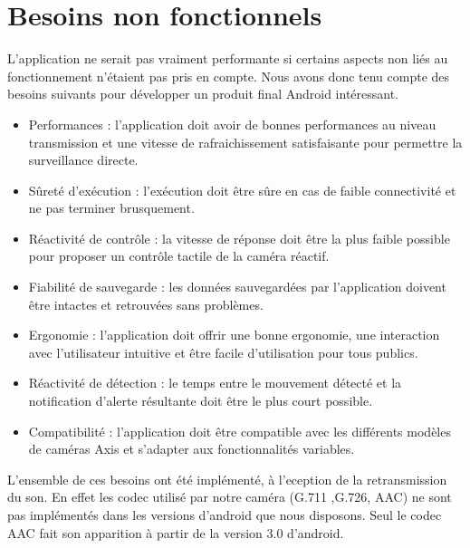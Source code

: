 \section{Besoins non fonctionnels}
L'application ne serait pas vraiment performante si certains aspects non liés au fonctionnement n'étaient pas pris en compte. Nous avons donc tenu compte des besoins suivants pour développer un produit final Android intéressant.
\begin{itemize}
  \item Performances : l'application doit avoir de bonnes performances au niveau transmission et une vitesse de rafraichissement satisfaisante pour permettre la surveillance directe.
  \item Sûreté d'exécution : l'exécution doit être sûre en cas de faible connectivité et ne pas terminer brusquement.
  \item Réactivité de contrôle : la vitesse de réponse doit être la plus faible possible pour proposer un contrôle tactile de la caméra réactif.
  \item Fiabilité de sauvegarde : les données sauvegardées par l'application doivent être intactes et retrouvées sans problèmes.
  \item Ergonomie : l'application doit offrir une bonne ergonomie, une interaction avec l'utilisateur intuitive et être facile d'utilisation pour tous publics.
  \item Réactivité de détection : le temps entre le mouvement détecté et la notification d'alerte résultante doit être le plus court possible.
  \item Compatibilité : l'application doit être compatible avec les différents modèles de caméras Axis et s'adapter aux fonctionnalités variables.
\end{itemize}
L'ensemble de ces besoins ont été implémenté, à l'eception de la retransmission
du son. En effet les codec utilisé par notre caméra (G.711 ,G.726, AAC) ne sont
pas implémentés dans les versions d'android que nous disposons. Seul le codec AAC fait son
apparition à partir de la version 3.0 d'android.
\clearpage